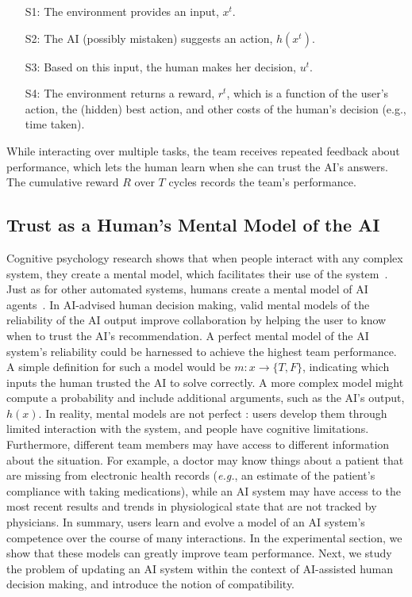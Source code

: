 \documentclass[letterpaper]{article} %
\newcommand{\eg}{\mbox{\it e.g.}}
\newcommand{\?}{\mbox{?}}
\newcommand{\name}{AI-advised human decision making}
\begin{document}
\begin{itemize}[leftmargin=.25in]
\item[S1:] The environment provides an input, $x^t$. 
\item[S2:] The AI (possibly mistaken) suggests an action, $h(x^t)$. 
\item[S3:] Based on this input, the human makes her decision, $u^t$.
\item[S4:] The environment returns a reward, $r^t$, which is a function of the user's action, the (hidden) best action, and other costs of the human's decision (e.g., time taken).
\end{itemize}

\noindent While interacting over multiple tasks, the team receives repeated feedback about performance, which lets the human learn when she can trust the AI's answers. The cumulative reward $R$ over $T$ cycles records the team's performance.


\subsection{Trust as a Human's Mental Model of the AI}

\noindent Cognitive psychology research shows that when people interact with any complex system, they create a mental model, which facilitates their use of the system~\cite{donald1988psychology}. Just as for other automated systems, humans create a mental model of AI agents~\cite{kulesza2012tell}.
In \name, valid mental models of the reliability of the AI output improve collaboration by helping the user to know when to trust the AI's recommendation.
A perfect mental model of the AI system's reliability could be harnessed to achieve the highest team performance. A simple definition for such a model would be $m: x \rightarrow \{T, F\}$, indicating which inputs the human trusted the AI to solve correctly. A more complex model might compute a probability and include additional arguments, such as  the AI's output, $h(x).$
In reality, mental models are not perfect \cite{norman2014some}: users develop them through limited interaction with the system, and people have cognitive limitations.
Furthermore, different team members may have access to different information about the situation. 
For example, a doctor may know things about a patient that are missing from electronic health records (\eg, an estimate of the patient's compliance with taking medications), while an AI system may have access to the most recent results and trends in physiological state that are not tracked by physicians. 
In summary, users learn and evolve a model of an AI system's competence over the course of many interactions. In the experimental section, we show that these models can greatly improve team performance. Next, we study the problem of updating an AI system within the context of AI-assisted human decision making, and introduce the notion of compatibility.
\end{document}
